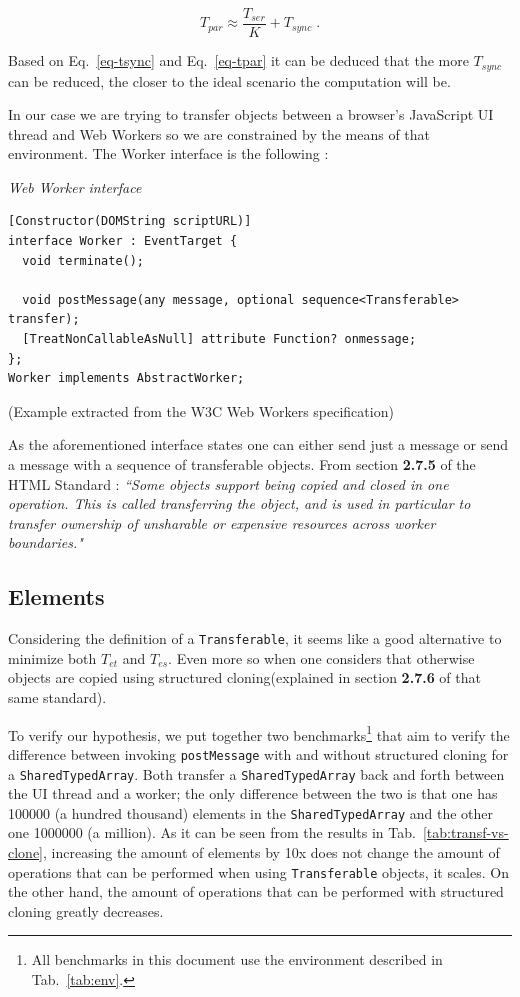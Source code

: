 \documentclass[runningheads,a4paper]{llncs}
\begin{document}
\begin{equation}
  T_{par} \approx \frac{T_{ser}}{K} + T_{sync} \;  .
  \label{eq-tpar}
\end{equation}

Based on Eq.~\ref{eq-tsync} and Eq.~\ref{eq-tpar} it can be deduced that the more \(T_{sync}\) can be reduced, the closer to the ideal scenario the computation will be.

In our case we are trying to transfer objects between a browser's JavaScript UI thread and Web Workers so we are constrained by the means of that environment. The Worker interface is the following \cite{w3c-ww}:
\medskip

\noindent
{\it Web Worker interface}
\begin{verbatim}
[Constructor(DOMString scriptURL)]
interface Worker : EventTarget {
  void terminate();

  void postMessage(any message, optional sequence<Transferable> transfer);
  [TreatNonCallableAsNull] attribute Function? onmessage;
};
Worker implements AbstractWorker;
\end{verbatim}
%
\noindent
{\small (Example extracted from the W3C Web Workers specification)}

As the aforementioned interface states one can either send just a message or send a message with a sequence of transferable objects. From section \textbf{2.7.5} of the HTML Standard \cite{html-whatwg}:
\textit{``Some objects support being copied and closed in one operation. This is called transferring the object, and is used in particular to transfer ownership of unsharable or expensive resources across worker boundaries."}

\subsection{Elements}
Considering the definition of a \verb+Transferable+, it seems like a good alternative to minimize both \(T_{et}\) and \(T_{es}\). Even more so when one considers that otherwise objects are copied using structured cloning(explained in section \textbf{2.7.6} of that same standard).

To verify our hypothesis, we put together two benchmarks\footnote{All benchmarks in this document use the environment described in Tab.~\ref{tab:env}.} that aim to verify the difference between invoking \verb+postMessage+ with and without structured cloning for a \verb+SharedTypedArray+. Both transfer a \verb+SharedTypedArray+ back and forth between the UI thread and a worker; the only difference between the two is that one has 100000 (a hundred thousand) elements in the \verb+SharedTypedArray+ and the other one 1000000 (a million). As it can be seen from the  results in Tab.~\ref{tab:transf-vs-clone}, increasing the amount of elements by 10x does not change the amount of operations that can be performed when using \verb+Transferable+ objects, it scales. On the other hand, the amount of operations that can be performed with structured cloning greatly decreases.
\end{document}
